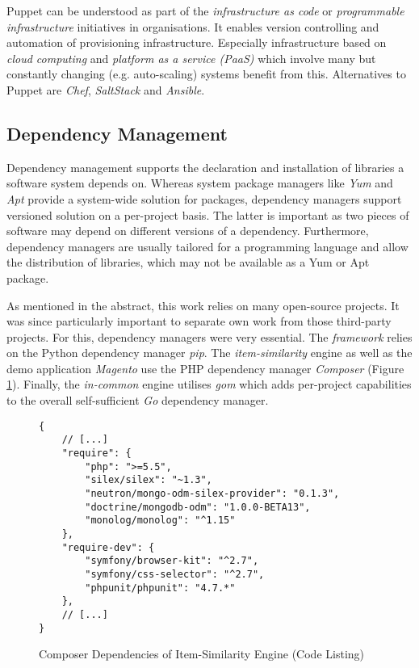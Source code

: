 Puppet can be understood as part of the \emph{infrastructure as code} or \emph{programmable infrastructure} initiatives in organisations. It enables version controlling and automation of provisioning infrastructure. Especially infrastructure based on \emph{cloud computing} and \emph{platform as a service (PaaS)} which involve many but constantly changing (e.g. auto-scaling) systems benefit from this. Alternatives to Puppet are \emph{Chef}, \emph{SaltStack} and \emph{Ansible}.

\subsection{Dependency Management}

Dependency management supports the declaration and installation of libraries a software system depends on. Whereas system package managers like \emph{Yum} and \emph{Apt} provide a system-wide solution for packages, dependency managers support versioned solution on a per-project basis. The latter is important as two pieces of software may depend on different versions of a dependency. Furthermore, dependency managers are usually tailored for a programming language and allow the distribution of libraries, which may not be available as a Yum or Apt package.

As mentioned in the abstract, this work relies on many open-source projects. It was since particularly important to separate own work from those third-party projects. For this, dependency managers were very essential. The \emph{framework} relies on the Python dependency manager \emph{pip}. The \emph{item-similarity} engine as well as the demo application \emph{Magento} use the PHP dependency manager \emph{Composer} (Figure \ref{fig:implementation-provisioning-dependency}). Finally, the \emph{in-common} engine utilises \emph{gom} which adds per-project capabilities to the overall self-sufficient \emph{Go} dependency manager.

\begin{figure}[!ht]
    \begin{verbatim}
{
    // [...]
    "require": {
        "php": ">=5.5",
        "silex/silex": "~1.3",
        "neutron/mongo-odm-silex-provider": "0.1.3",
        "doctrine/mongodb-odm": "1.0.0-BETA13",
        "monolog/monolog": "^1.15"
    },
    "require-dev": {
        "symfony/browser-kit": "^2.7",
        "symfony/css-selector": "^2.7",
        "phpunit/phpunit": "4.7.*"
    },
    // [...]
}
    \end{verbatim}
    \caption{Composer Dependencies of Item-Similarity Engine (Code Listing)}
    \label{fig:implementation-provisioning-dependency}
\end{figure}